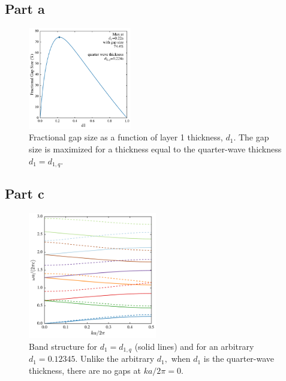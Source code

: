 \documentclass[aps,letterpaper,10pt]{article}
\begin{document}
\subsection{Part a}
\begin{figure}[!h]
\centering
\includegraphics[width=0.4\textwidth]{4a-1}
\caption{\label{fig:4a} Fractional gap size as a function of layer 1 thickness, $d_1$. The gap size is maximized for a thickness equal to the quarter-wave thickness $d_1=d_{1,q}$.}
\end{figure}

\subsection{Part c}
\begin{figure}[!h]
\centering
\includegraphics[width=0.5\textwidth]{4c-1}
\caption{\label{fig:4c} Band structure for $d_1 = d_{1,q}$ (solid lines) and for an arbitrary $d_1=0.12345.$ Unlike the arbitrary $d_1,$ when $d_1$ is the quarter-wave thickness, there are no gaps at $ka/2\pi=0$.}
\end{figure}
\end{document}
